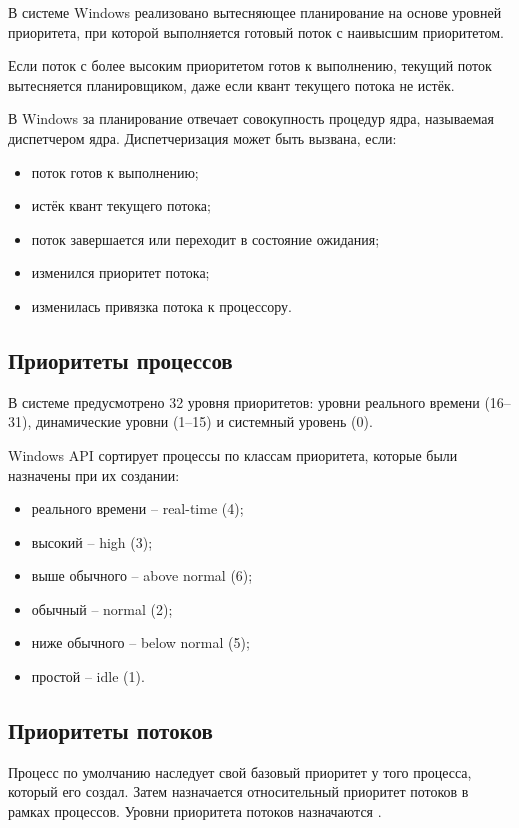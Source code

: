 В системе Windows реализовано вытесняющее планирование на основе уровней приоритета, при которой выполняется готовый поток с наивысшим приоритетом.

Если поток с более высоким приоритетом готов к выполнению, текущий поток вытесняется планировщиком, даже если квант текущего потока не истёк.

В Windows за планирование отвечает совокупность процедур ядра, называемая диспетчером ядра. Диспетчеризация может быть вызвана, если:

\begin{itemize}
	\item поток готов к выполнению;
	\item истёк квант текущего потока;
	\item поток завершается или переходит в состояние ожидания;
	\item изменился приоритет потока;
	\item изменилась привязка потока к процессору.
\end{itemize}

\subsection{Приоритеты процессов}

В системе предусмотрено 32 уровня приоритетов: уровни реального времени (16–31), динамические уровни (1–15) и системный уровень (0).

Windows API сортирует процессы по классам приоритета, которые были назначены при их создании:

\begin{itemize}
	\item реального времени -- real-time (4);
	\item высокий -- high (3);
	\item выше обычного -- above normal (6);
	\item обычный -- normal (2);
	\item ниже обычного -- below normal (5);
	\item простой -- idle (1).
\end{itemize}

\subsection{Приоритеты потоков}

Процесс по умолчанию наследует свой базовый приоритет у того процесса, который его создал. Затем назначается относительный приоритет потоков в рамках процессов. Уровни приоритета потоков назначаются .

